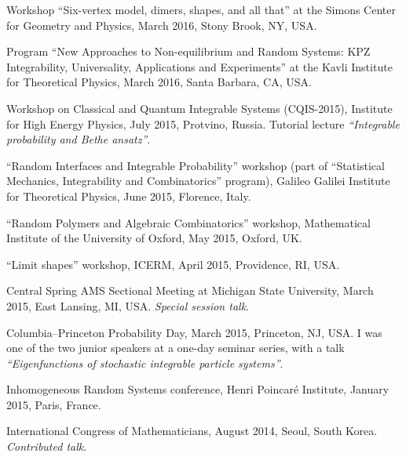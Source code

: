 \documentclass[letterpaper,11pt]{article}
\begin{document}
\begin{etaremune}
	\item
	      Workshop ``Six-vertex model, dimers, shapes, and all that'' at
	      the Simons Center for Geometry and Physics, March 2016, Stony Brook, NY, USA.

	\item
	      Program ``New Approaches to Non-equilibrium and Random Systems:
	      KPZ Integrability, Universality, Applications and Experiments'' at the Kavli
	      Institute for Theoretical Physics, March 2016, Santa Barbara, CA, USA.

	\item
	      Workshop on Classical and Quantum Integrable Systems
	      (CQIS-2015), Institute for High Energy Physics, July 2015, Protvino, Russia.
	      Tutorial lecture \emph{``Integrable probability and Bethe   ansatz''}.

	\item
	      ``Random Interfaces and Integrable Probability'' workshop (part
	      of ``Statistical Mechanics, Integrability and Combinatorics''
	      program), Galileo Galilei Institute for Theoretical Physics, June 2015,
	      Florence, Italy.

	\item
	      ``Random Polymers and Algebraic Combinatorics'' workshop,
	      Mathematical Institute of the University of Oxford, May 2015,
	      Oxford, UK.

	\item
	      ``Limit shapes'' workshop, ICERM, April 2015, Providence, RI,
	      USA.   %

	\item
	      Central Spring AMS Sectional Meeting at Michigan State
	      University, March 2015, East Lansing, MI, USA. \emph{Special session talk}.

	\item
	      Columbia--Princeton Probability Day, March 2015, Princeton, NJ,
	      USA. I was one of the two junior speakers at a one-day seminar series, with a
	      talk \emph{``Eigenfunctions of stochastic integrable particle systems''}.

	\item
	      Inhomogeneous Random Systems conference, Henri Poincar\'e
	      Institute, January 2015, Paris, France.

	\item
	      International Congress of Mathematicians, August 2014, Seoul,
	      South Korea. \emph{Contributed talk}.


\end{etaremune}
\end{document}
